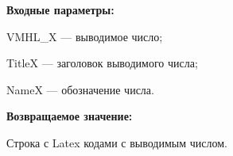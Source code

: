 \textbf{Входные параметры:}
 
VMHL\_X --- выводимое число;
 
TitleX --- заголовок выводимого числа;
 
NameX --- обозначение числа.

\textbf{Возвращаемое значение:}

Строка с Latex кодами с выводимым числом.